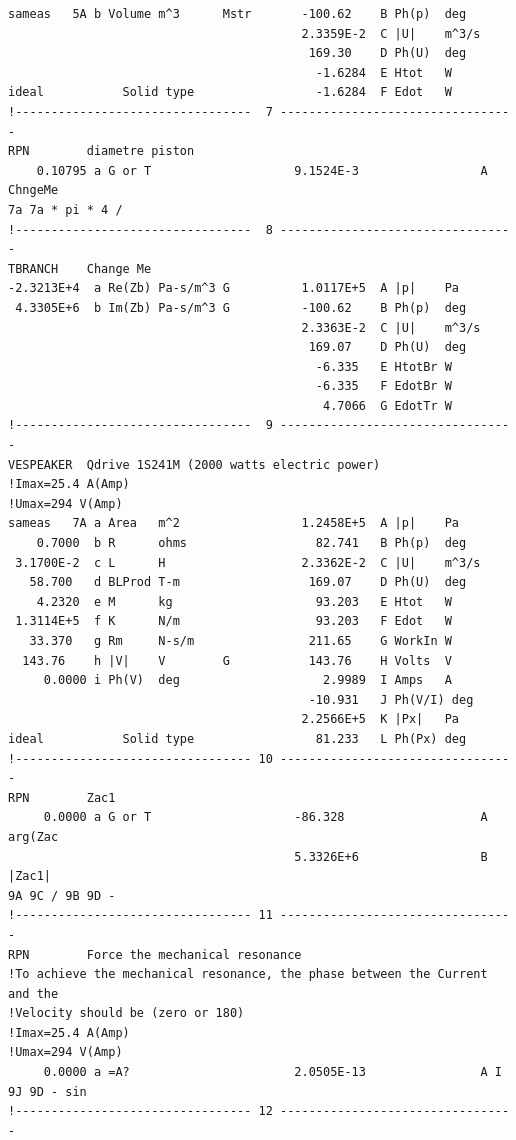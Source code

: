 \begin{linenumbers}
\begin{verbatim}
sameas   5A b Volume m^3      Mstr       -100.62    B Ph(p)  deg
                                         2.3359E-2  C |U|    m^3/s
                                          169.30    D Ph(U)  deg
                                           -1.6284  E Htot   W
ideal           Solid type                 -1.6284  F Edot   W
!---------------------------------  7 ---------------------------------
RPN        diametre piston
    0.10795 a G or T                    9.1524E-3                 A ChngeMe
7a 7a * pi * 4 /
!---------------------------------  8 ---------------------------------
TBRANCH    Change Me
-2.3213E+4  a Re(Zb) Pa-s/m^3 G          1.0117E+5  A |p|    Pa
 4.3305E+6  b Im(Zb) Pa-s/m^3 G          -100.62    B Ph(p)  deg
                                         2.3363E-2  C |U|    m^3/s
                                          169.07    D Ph(U)  deg
                                           -6.335   E HtotBr W
                                           -6.335   F EdotBr W
                                            4.7066  G EdotTr W
!---------------------------------  9 ---------------------------------
VESPEAKER  Qdrive 1S241M (2000 watts electric power)
!Imax=25.4 A(Amp)
!Umax=294 V(Amp)
sameas   7A a Area   m^2                 1.2458E+5  A |p|    Pa
    0.7000  b R      ohms                  82.741   B Ph(p)  deg
 3.1700E-2  c L      H                   2.3362E-2  C |U|    m^3/s
   58.700   d BLProd T-m                  169.07    D Ph(U)  deg
    4.2320  e M      kg                    93.203   E Htot   W
 1.3114E+5  f K      N/m                   93.203   F Edot   W
   33.370   g Rm     N-s/m                211.65    G WorkIn W
  143.76    h |V|    V        G           143.76    H Volts  V
     0.0000 i Ph(V)  deg                    2.9989  I Amps   A
                                          -10.931   J Ph(V/I) deg
                                         2.2566E+5  K |Px|   Pa
ideal           Solid type                 81.233   L Ph(Px) deg
!--------------------------------- 10 ---------------------------------
RPN        Zac1
     0.0000 a G or T                    -86.328                   A arg(Zac
                                        5.3326E+6                 B |Zac1|
9A 9C / 9B 9D -
!--------------------------------- 11 ---------------------------------
RPN        Force the mechanical resonance
!To achieve the mechanical resonance, the phase between the Current and the
!Velocity should be (zero or 180)
!Imax=25.4 A(Amp)
!Umax=294 V(Amp)
     0.0000 a =A?                       2.0505E-13                A I
9J 9D - sin
!--------------------------------- 12 ---------------------------------

\end{verbatim}
\end{linenumbers}
